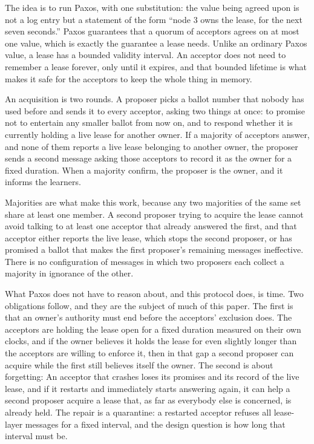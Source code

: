 \documentclass[final,5p,times,twocolumn,number]{elsarticle}
\begin{document}
The idea is to run Paxos, with one substitution: the value being agreed upon is not a log entry but a statement of the form ``node 3 owns the lease, for the next seven seconds.''  Paxos guarantees that a quorum of acceptors agrees on at most one value, which is exactly the guarantee a lease needs.  Unlike an ordinary Paxos value, a lease has a bounded validity interval.  An acceptor does not need to remember a lease forever, only until it expires, and that bounded lifetime is what makes it safe for the acceptors to keep the whole thing in memory.

An acquisition is two rounds.  A proposer picks a ballot number that nobody has used before and sends it to every acceptor, asking two things at once: to promise not to entertain any smaller ballot from now on, and to respond whether it is currently holding a live lease for another owner.  If a majority of acceptors answer, and none of them reports a live lease belonging to another owner, the proposer sends a second message asking those acceptors to record it as the owner for a fixed duration.  When a majority confirm, the proposer is the owner, and it informs the learners.

Majorities are what make this work, because any two majorities of the same set share at least one member.  A second proposer trying to acquire the lease cannot avoid talking to at least one acceptor that already answered the first, and that acceptor either reports the live lease, which stops the second proposer, or has promised a ballot that makes the first proposer's remaining messages ineffective.  There is no configuration of messages in which two proposers each collect a majority in ignorance of the other.

What Paxos does not have to reason about, and this protocol does, is time.  Two obligations follow, and they are the subject of much of this paper.  The first is that an owner's authority must end before the acceptors' exclusion does.  The acceptors are holding the lease open for a fixed duration measured on their own clocks, and if the owner believes it holds the lease for even slightly longer than the acceptors are willing to enforce it, then in that gap a second proposer can acquire while the first still believes itself the owner.  The second is about forgetting: An acceptor that crashes loses its promises and its record of the live lease, and if it restarts and immediately starts answering again, it can help a second proposer acquire a lease that, as far as everybody else is concerned, is already held.  The repair is a quarantine: a restarted acceptor refuses all lease-layer messages for a fixed interval, and the design question is how long that interval must be.
\end{document}
